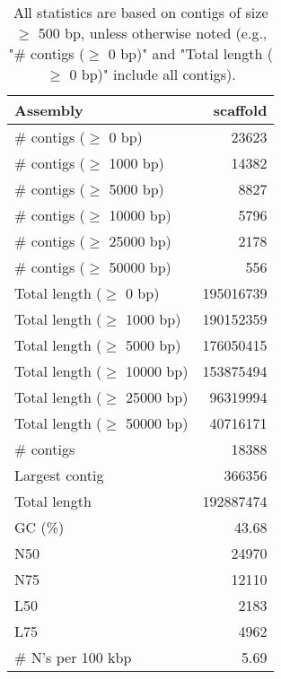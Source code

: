 \documentclass[12pt,a4paper]{article}
\begin{document}
\begin{table}[ht]
\begin{center}
\caption{All statistics are based on contigs of size $\geq$ 500 bp, unless otherwise noted (e.g., "\# contigs ($\geq$ 0 bp)" and "Total length ($\geq$ 0 bp)" include all contigs).}
\begin{tabular}{|l*{1}{|r}|}
\hline
Assembly & scaffold \\ \hline
\# contigs ($\geq$ 0 bp) & 23623 \\ \hline
\# contigs ($\geq$ 1000 bp) & 14382 \\ \hline
\# contigs ($\geq$ 5000 bp) & 8827 \\ \hline
\# contigs ($\geq$ 10000 bp) & 5796 \\ \hline
\# contigs ($\geq$ 25000 bp) & 2178 \\ \hline
\# contigs ($\geq$ 50000 bp) & 556 \\ \hline
Total length ($\geq$ 0 bp) & 195016739 \\ \hline
Total length ($\geq$ 1000 bp) & 190152359 \\ \hline
Total length ($\geq$ 5000 bp) & 176050415 \\ \hline
Total length ($\geq$ 10000 bp) & 153875494 \\ \hline
Total length ($\geq$ 25000 bp) & 96319994 \\ \hline
Total length ($\geq$ 50000 bp) & 40716171 \\ \hline
\# contigs & 18388 \\ \hline
Largest contig & 366356 \\ \hline
Total length & 192887474 \\ \hline
GC (\%) & 43.68 \\ \hline
N50 & 24970 \\ \hline
N75 & 12110 \\ \hline
L50 & 2183 \\ \hline
L75 & 4962 \\ \hline
\# N's per 100 kbp & 5.69 \\ \hline
\end{tabular}
\end{center}
\end{table}
\end{document}
